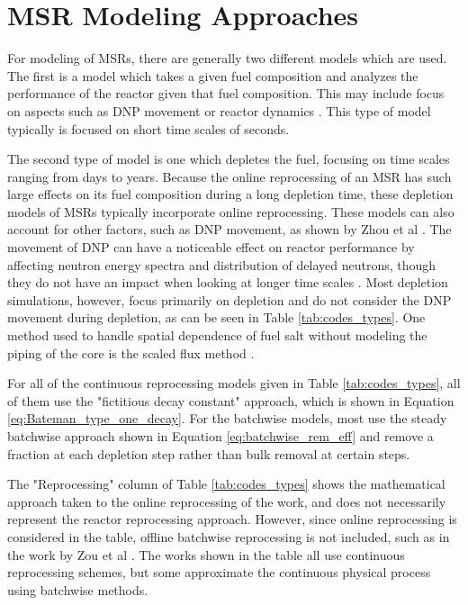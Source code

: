 \section{MSR Modeling Approaches}

For modeling of MSRs, there are generally two different models which are used. The first is a model which takes a given fuel composition and analyzes the performance of the reactor given that fuel composition. This may include focus on aspects such as DNP movement \cite{fei_molten_2020, shi_gen-foam_2021} or reactor dynamics \cite{singh_plant-level_2020, cervi_development_2019, aufiero_development_2014, cui_development_2022, singh_dynamics_2017}. This type of model typically is focused on short time scales of seconds.

The second type of model is one which depletes the fuel, focusing on time scales ranging from days to years. Because the online reprocessing of an MSR has such large effects on its fuel composition during a long depletion time, these depletion models of MSRs typically incorporate online reprocessing. These models can also account for other factors, such as DNP movement, as shown by Zhou et al \cite{zhou_fuel_2018}. The movement of DNP can have a noticeable effect on reactor performance by affecting neutron energy spectra and distribution of delayed neutrons, though they do not have an impact when looking at longer time scales \cite{betzler_implementation_2017}. Most depletion simulations, however, focus primarily on depletion and do not consider the DNP movement during depletion, as can be seen in Table \ref{tab:codes_types}. One method used to handle spatial dependence of fuel salt without modeling the piping of the core is the scaled flux method \cite{betzler_liquid-fueled_2021}.

For all of the continuous reprocessing models given in Table \ref{tab:codes_types}, all of them use the "fictitious decay constant" approach, which is shown in Equation \eqref{eq:Bateman_type_one_decay}. For the batchwise models, most use the steady batchwise approach shown in Equation \eqref{eq:batchwise_rem_eff} and remove a fraction at each depletion step rather than bulk removal at certain steps.

The "Reprocessing" column of Table \ref{tab:codes_types} shows the mathematical approach taken to the online reprocessing of the work, and does not necessarily represent the reactor reprocessing approach. However, since online reprocessing is considered in the table, offline batchwise reprocessing is not included, such as in the work by Zou et al \cite{zou_transition_2020}. The works shown in the table all use continuous reprocessing schemes, but some approximate the continuous physical process using batchwise methods.

